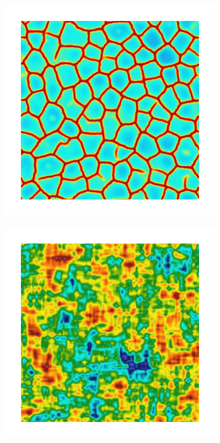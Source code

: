 \begin{figure}[!htb]
\begin{subfigure}[b]{0.15\textwidth}
    \caption{}
    \label{fig: Chapter4/2D/psic_sqexp_cartesian_5_5_rho_0_seed_c}
  \end{subfigure}
  \begin{subfigure}[b]{0.15\textwidth}
    \includegraphics[width=\textwidth]{Chapter4/figures/2D/d_sqexp_cartesian_5_5_rho_0_seed_c.png}
    \caption{}
    \label{fig: Chapter4/2D/d_sqexp_cartesian_5_5_rho_0_seed_c}
  \end{subfigure}
  \begin{subfigure}[b]{0.15\textwidth}
    \includegraphics[width=\textwidth]{Chapter4/figures/2D/Gc_exp_cartesian_5_5_rho_0_seed_c.png}

\end{subfigure}
\end{figure}

